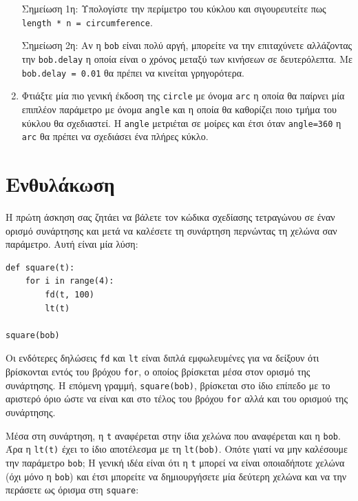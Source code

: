 \documentclass[10pt]{book}
\begin{document}
\begin{enumerate}
Σημείωση 1η: Υπολογίστε την περίμετρο του κύκλου και σιγουρευτείτε πως {\tt length * n = circumference}.

Σημείωση 2η: Αν η {\tt bob} είναι πολύ αργή, μπορείτε να την επιταχύνετε αλλάζοντας
την {\tt bob.delay} η οποία είναι ο χρόνος μεταξύ των κινήσεων σε δευτερόλεπτα. Με {\tt bob.delay = 0.01}  θα πρέπει να κινείται γρηγορότερα.


\item Φτιάξτε μία πιο γενική έκδοση της {\tt circle} με όνομα {\tt arc} 
η οποία θα παίρνει μία επιπλέον παράμετρο με όνομα {\tt angle} και η οποία θα καθορίζει ποιο τμήμα του  κύκλου θα σχεδιαστεί. Η {\tt angle} μετριέται σε μοίρες και έτσι όταν {\tt angle=360} η {\tt arc}
θα πρέπει να σχεδιάσει ένα πλήρες κύκλο.

\end{enumerate}

\section{Ενθυλάκωση}

Η πρώτη άσκηση σας ζητάει να βάλετε τον κώδικα σχεδίασης τετραγώνου σε
έναν ορισμό συνάρτησης και μετά να καλέσετε τη συνάρτηση περνώντας τη χελώνα σαν παράμετρο. Αυτή είναι μία λύση:


\begin{verbatim}
def square(t):
    for i in range(4):
        fd(t, 100)
        lt(t)

square(bob)
\end{verbatim}
%

Οι ενδότερες δηλώσεις {\tt fd} και {\tt lt} είναι διπλά εμφωλευμένες για να
δείξουν ότι βρίσκονται εντός του βρόχου {\tt for}, ο οποίος βρίσκεται μέσα στον
ορισμό της συνάρτησης. Η επόμενη γραμμή,  {\tt square(bob)},  βρίσκεται στο
ίδιο επίπεδο με το αριστερό όριο ώστε να είναι και στο τέλος του βρόχου {\tt for} αλλά και του ορισμού της συνάρτησης.

Μέσα στη συνάρτηση, η {\tt t} αναφέρεται στην ίδια χελώνα που αναφέρεται και η
{\tt bob}. Άρα η {\tt lt(t)} έχει το ίδιο αποτέλεσμα με τη {\tt lt(bob)}. 
Οπότε γιατί να μην καλέσουμε την παράμετρο {\tt bob};  Η γενική ιδέα είναι ότι η {\tt t} μπορεί να είναι οποιαδήποτε χελώνα (όχι μόνο η {\tt bob}) και έτσι μπορείτε να δημιουργήσετε μία δεύτερη χελώνα και να την περάσετε ως όρισμα στη {\tt square}:
\end{document}
